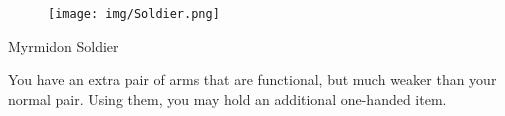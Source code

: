 \newpage

\begin{figure}[ht!]
	\texttt{[image: img/Soldier.png]}
\end{figure}

\begin{monsterbox}{Myrmidon Soldier}
	\vspace{.1in}
	\hline
	\stats[
	STR = +1,
	DEX = -1,
	VIT = +1,
	FOC = +1,
	WILL = -1
	]
	\hline
	
	\vspace{.1in}
	
	\begin{monsteraction}
		You have an extra pair of arms that are functional, but much weaker than your normal pair. Using them, you may hold an additional one-handed item.
	\end{monsteraction}
\end{monsterbox}
